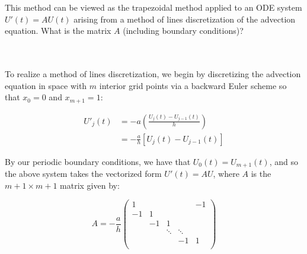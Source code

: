This method can be viewed as the trapezoidal method applied to an ODE system $U'(t) = AU(t)$ arising from a method of
lines discretization of the advection equation. What is the matrix $A$ (including boundary conditions)?

\begin{solution}\ \\\\
    To realize a method of lines discretization, we begin by discretizing the advection equation in space with $m$ 
    interior grid points via a backward Euler scheme so that $x_0 = 0$ and $x_{m+1} = 1$:

    \begin{align*}
    U'_j(t) &= -a \left( \frac{U_j(t) - U_{j-1}(t)}{h} \right) \\
            &= -\frac{a}{h} [U_j(t) - U_{j-1}(t)]
    \end{align*}

    By our periodic boundary conditions, we have that $U_0(t) = U_{m+1}(t)$, and so the above system takes the 
    vectorized form $U'(t) = AU$, where $A$ is the $m + 1 \times m + 1$ matrix given by:

    \[
    A = -\frac{a}{h}\begin{pmatrix} 
         1 &         &        &        & -1 \\
        -1 &       1 &        &        &    \\
           &      -1 &      1 &        &    \\
           &         & \ddots & \ddots &    \\
           &         &        & -1     & 1  \\
    \end{pmatrix}
    \]
 

    \ \\
\end{solution}